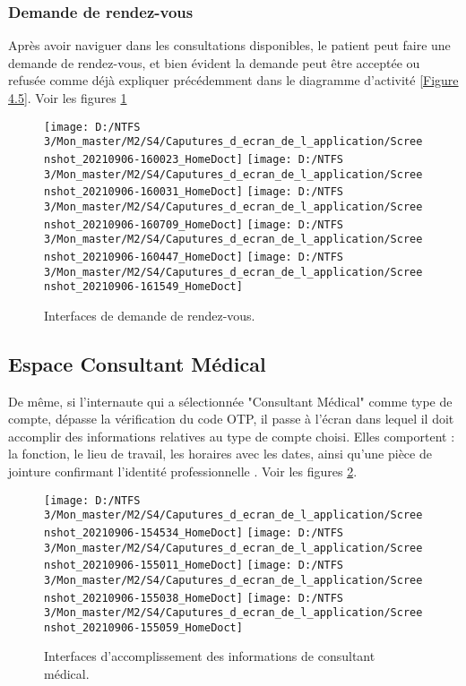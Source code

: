 \subsubsection{Demande de rendez-vous}
Après avoir naviguer dans les consultations disponibles, le patient peut faire une demande de rendez-vous, et bien évident la demande peut être acceptée ou refusée comme déjà expliquer précédemment dans le diagramme d'activité \ref{Figure 4.5}. Voir les figures \ref{Figure 5.5}
\begin{figure}[!h]
	\texttt{[image: D:/NTFS 3/Mon\_master/M2/S4/Caputures\_d\_ecran\_de\_l\_application/Screenshot\_20210906-160023\_HomeDoct]}
	\texttt{[image: D:/NTFS 3/Mon\_master/M2/S4/Caputures\_d\_ecran\_de\_l\_application/Screenshot\_20210906-160031\_HomeDoct]}
	\texttt{[image: D:/NTFS 3/Mon\_master/M2/S4/Caputures\_d\_ecran\_de\_l\_application/Screenshot\_20210906-160709\_HomeDoct]}
	\texttt{[image: D:/NTFS 3/Mon\_master/M2/S4/Caputures\_d\_ecran\_de\_l\_application/Screenshot\_20210906-160447\_HomeDoct]}
	\texttt{[image: D:/NTFS 3/Mon\_master/M2/S4/Caputures\_d\_ecran\_de\_l\_application/Screenshot\_20210906-161549\_HomeDoct]}
	\centering
	\caption{Interfaces de demande de rendez-vous.}
	\label{Figure 5.5}
\end{figure}

\subsection{Espace Consultant Médical}
De même, si l'internaute qui a sélectionnée "Consultant Médical" comme type de compte, dépasse la vérification du code \gls{OTP}, il passe à l'écran dans lequel il doit accomplir des informations relatives au type de compte choisi. Elles comportent : la fonction, le lieu de travail, les horaires avec les dates, ainsi qu'une pièce de jointure confirmant l'identité professionnelle . Voir les figures \ref{Figure 5.6}.
\begin{figure}[!h]
	\texttt{[image: D:/NTFS 3/Mon\_master/M2/S4/Caputures\_d\_ecran\_de\_l\_application/Screenshot\_20210906-154534\_HomeDoct]}
	\texttt{[image: D:/NTFS 3/Mon\_master/M2/S4/Caputures\_d\_ecran\_de\_l\_application/Screenshot\_20210906-155011\_HomeDoct]}
	\texttt{[image: D:/NTFS 3/Mon\_master/M2/S4/Caputures\_d\_ecran\_de\_l\_application/Screenshot\_20210906-155038\_HomeDoct]}
	\texttt{[image: D:/NTFS 3/Mon\_master/M2/S4/Caputures\_d\_ecran\_de\_l\_application/Screenshot\_20210906-155059\_HomeDoct]}
	\centering
	\caption{Interfaces d'accomplissement des informations de consultant médical.}
	\label{Figure 5.6}
\end{figure}
